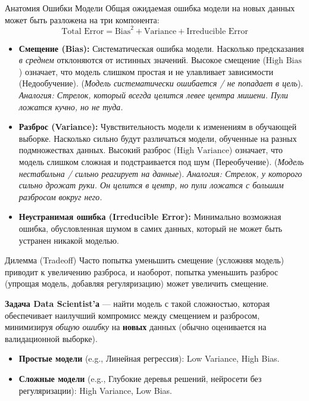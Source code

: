     \begin{textbox}{Анатомия Ошибки Модели}
    Общая ожидаемая ошибка модели на новых данных может быть разложена на три компонента:
    \[ \text{Total Error} = \text{Bias}^2 + \text{Variance} + \text{Irreducible Error} \]
    \begin{itemize}
        \item \textbf{Смещение (Bias):} Систематическая ошибка модели. Насколько предсказания \textit{в среднем} отклоняются от истинных значений. Высокое смещение ($\text{High Bias}$) означает, что модель слишком простая и не улавливает зависимости (Недообучение). (\textit{Модель систематически ошибается / не попадает в цель}). \textit{Аналогия: Стрелок, который всегда целится левее центра мишени. Пули ложатся кучно, но не туда.}
        \item \textbf{Разброс (Variance):} Чувствительность модели к изменениям в обучающей выборке. Насколько сильно будут различаться модели, обученные на разных подмножествах данных. Высокий разброс ($\text{High Variance}$) означает, что модель слишком сложная и подстраивается под шум (Переобучение). (\textit{Модель нестабильна / сильно реагирует на данные}). \textit{Аналогия: Стрелок, у которого сильно дрожат руки. Он целится в центр, но пули ложатся с большим разбросом вокруг него.}
        \item \textbf{Неустранимая ошибка (Irreducible Error):} Минимально возможная ошибка, обусловленная шумом в самих данных, который не может быть устранен никакой моделью.
    \end{itemize}
    \end{textbox}
    
    \begin{myblock}{Дилемма (Tradeoff)}
    Часто попытка уменьшить смещение (усложняя модель) приводит к увеличению разброса, и наоборот, попытка уменьшить разброс (упрощая модель, добавляя регуляризацию) может увеличить смещение.
    
    \textbf{Задача Data Scientist'а} — найти модель с такой сложностью, которая обеспечивает наилучший компромисс между смещением и разбросом, минимизируя \textit{общую ошибку} на \textbf{новых} данных (обычно оценивается на валидационной выборке).
    
    \begin{itemize}
        \item \textbf{Простые модели} (e.g., Линейная регрессия): Low Variance, High Bias.
        \item \textbf{Сложные модели} (e.g., Глубокие деревья решений, нейросети без регуляризации): High Variance, Low Bias.
    \end{itemize}
    \end{myblock}
    
